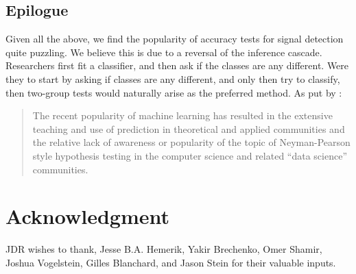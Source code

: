 \documentclass[journal]{IEEEtran}
\begin{document}
\subsection{Epilogue}
Given all the above, we find the popularity of accuracy tests for signal detection quite puzzling. 
We believe this is due to a reversal of the inference cascade. 
Researchers first fit a classifier, and then ask if the classes are any different.
Were they to start by asking if classes are any different, and only then try to classify, then two-group tests would naturally arise as the preferred method. 
As put by \cite{ramdas_classification_2016}:
\begin{quote}
	The recent popularity of machine learning has resulted in the extensive teaching and use
	of prediction in theoretical and applied communities and the relative lack of awareness or
	popularity of the topic of Neyman-Pearson style hypothesis testing in the computer science
	and related ``data science'' communities.
\end{quote}




\section*{Acknowledgment}
JDR wishes to thank, Jesse B.A. Hemerik, Yakir Brechenko, Omer Shamir, Joshua Vogelstein, Gilles Blanchard, and Jason Stein for their valuable inputs. 

\ifCLASSOPTIONcaptionsoff
  \newpage
\fi






%

%
%
\end{document}
